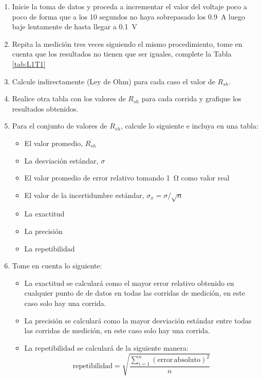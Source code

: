 \documentclass[12pt,letterpaper]{report}
\begin{document}
\begin{enumerate}
\item Inicie la toma de datos y proceda a incrementar el valor del voltaje poco a poco de forma que a los 10 segundos no haya sobrepasado los \SI{0.9}{\ampere} luego baje lentamente de hasta llegar a \SI{0.1}{\volt}
\item Repita la medición tres veces siguiendo el mismo procedimiento, tome en cuenta que los resultados no tienen que ser iguales, complete la Tabla \ref{tab:L1T1}
\item Calcule indirectamente (Ley de Ohm) para cada caso el valor de $R_{sh}$.
\item Realice otra tabla con los valores de $R_{sh}$ para cada corrida y grafique los resultados obtenidos.
\item Para el conjunto de valores de $R_{sh}$, calcule lo siguiente e incluya en una tabla:
    \begin{itemize}
        \item El valor promedio, $\overline{R_{sh}}$ 
        \item La desviación estándar, $\sigma$
        \item El valor promedio de error relativo tomando \SI{1}{\ohm} como valor real
        \item El valor de la incertidumbre estándar, $\sigma_x = \sigma / \sqrt{n}$
        \item La exactitud
        \item La precisión
        \item La repetibilidad
    \end{itemize}
    
\item Tome en cuenta lo siguiente:
    \begin{itemize}
        \item La exactitud se calculará como el mayor error relativo obtenido en cualquier punto de de datos en todas las corridas de medición, en este caso solo hay una corrida.
        \item La precisión se calculará como la mayor desviación estándar entre todas las corridas de medición, en este caso solo hay una corrida.
        \item La repetibilidad se calculará de la siguiente manera:
        \begin{equation*}
            \mathrm{repetibilidad} = \sqrt{\dfrac{\sum_{i=1}^n(\mathrm{error\,absoluto})^2}{n}}
        \end{equation*}
    \end{itemize}


\end{enumerate}
\end{document}
